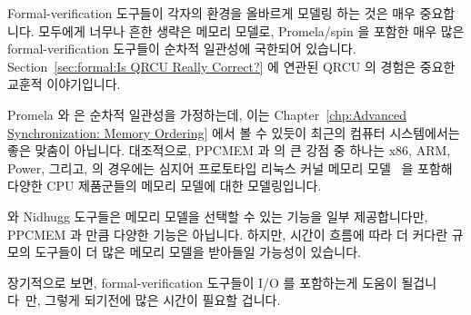 Formal-verification 도구들이 각자의 환경을 올바르게 모델링 하는 것은 매우
중요합니다.
모두에게 너무나 흔한 생략은 메모리 모델로, Promela/spin 을 포함한 매우 많은
formal-verification 도구들이 순차적 일관성에 국한되어 있습니다.
Section~\ref{sec:formal:Is QRCU Really Correct?}
에 연관된 QRCU 의 경험은 중요한 교훈적 이야기입니다.

Promela 와  은 순차적 일관성을 가정하는데, 이는
Chapter~\ref{chp:Advanced Synchronization: Memory Ordering} 에서 볼 수 있듯이
최근의 컴퓨터 시스템에서는 좋은 맞춤이 아닙니다.
대조적으로, PPCMEM 과  의 큰 강점 중 하나는 x86, ARM, Power, 그리고,
 의 경우에는 심지어 프로토타입 리눅스 커널 메모리
모델~\cite{JadeAlglave2017LWN-LKMM-1,JadeAlglave2017LWN-LKMM-2} 을 포함해
다양한 CPU 제품군들의 메모리 모델에 대한 모델링입니다.
\iffalse

It is critically important that formal-verification tools correctly
model their environment.
One all-too-common omission is the memory model, where a great
many formal-verification tools, including Promela/spin, are
restricted to sequential consistency.
The QRCU experience related in
Section~\ref{sec:formal:Is QRCU Really Correct?}
is an important cautionary tale.

Promela and \co{spin} assume sequential consistency, which is not a
good match for modern computer systems, as will be seen in
Chapter~\ref{chp:Advanced Synchronization: Memory Ordering}.
In contrast, one of the great strengths of PPCMEM and \co{herd}
is their detailed modeling of various CPU families memory models,
including x86, ARM, Power, and, in the case of \co{herd},
even a prototype Linux-kernel memory
model~\cite{JadeAlglave2017LWN-LKMM-1,JadeAlglave2017LWN-LKMM-2}.
\fi

 와 Nidhugg 도구들은 메모리 모델을 선택할 수 있는 기능을 일부
제공합니다만, PPCMEM 과  만큼 다양한 기능은 아닙니다.
하지만, 시간이 흐름에 따라 더 커다란 규모의 도구들이 더 많은 메모리 모델을
받아들일 가능성이 있습니다.

장기적으로 보면, formal-verification 도구들이 I/O 를 포함하는게 도움이
될겁니다~\cite{PaulEMcKenney2016LinuxKernelMMIO}만, 그렇게 되기전에 많은 시간이
필요할 겁니다.
\iffalse

The \co{cbmc} and Nidhugg tools provide some ability to select
memory models, but do not provide the variety that PPCMEM and
\co{herd} do.
However, it is likely that the larger-scale tools will adopt
a greater variety of memory models as time goes on.

In the longer term, it would be helpful for formal-verification
tools to include I/O~\cite{PaulEMcKenney2016LinuxKernelMMIO},
but it may be some time before this comes to pass.
\fi

